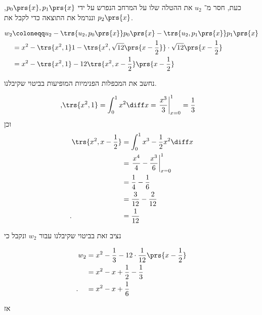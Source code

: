 \documentclass[a4paper,10pt,twoside,openany]{article}
\begin{document}
\begin{solution}
כעת, חסר מ־%
$u_2$
את ההטלה שלו על המרחב הנפרש על ידי
$p_0\prs{x}, p_1\prs{x}$,
וננרמל את התוצאה כדי לקבל את
$p_2\prs{x}$.

\begin{align*}
w_2 &\coloneqq u_2 - \trs{u_2, p_0\prs{x}} p_0\prs{x} - \trs{u_2, p_1\prs{x}} p_1\prs{x}
\\&=
x^2 - \trs{x^2, 1} 1 - \trs{x^2, \sqrt{12} \prs{x - \frac{1}{2}}} \cdot \sqrt{12} \prs{x - \frac{1}{2}}
\\&=
x^2 - \trs{x^2, 1} - 12 \trs{x^2, x - \frac{1}{2}} \prs{x - \frac{1}{2}}
\end{align*}

נחשב את המכפלות הפנימיות המופיעות בביטוי שקיבלנו.

\begin{align*}
\text{,} \trs{x^2, 1} &= \int_0^1 x^2 \diff x = \left. \frac{x^3}{3} \right|_{x=0}^1 = \frac{1}{3}
\end{align*}
וכן
\begin{align*}
\trs{x^2, x - \frac{1}{2}} &= \int_0^1 x^3 - \frac{1}{2} x^2 \diff x
\\&=
\left. \frac{x^4}{4} - \frac{x^3}{6} \right|_{x=0}^1
\\&=
\frac{1}{4} - \frac{1}{6}
\\&=
\frac{3}{12} - \frac{2}{12}
\\\text{.} \hphantom{\trs{x^2, x - \frac{1}{2}}} &=
\frac{1}{12}
\end{align*}

נציב זאת בביטוי שקיבלנו עבור
$w_2$
ונקבל כי

\begin{align*}
w_2 &= x^2 - \frac{1}{3} - 12 \cdot \frac{1}{12} \prs{x - \frac{1}{2}}
\\&=
x^2 - x + \frac{1}{2} - \frac{1}{3}
\\ \text{.} \hphantom{w_2} &=
x^2 -x + \frac{1}{6}
\end{align*}

אז


\end{solution}
\end{document}
